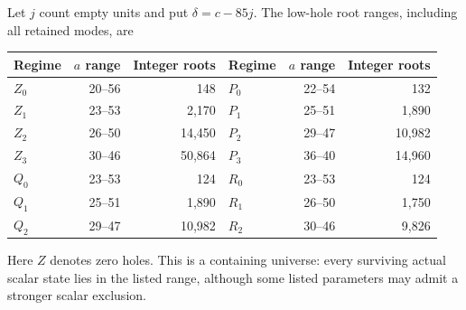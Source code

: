 \documentclass[11pt,a4paper]{article}
\begin{document}
Let $j$ count empty units and put $\delta=c-85j$.
The low-hole root ranges, including all retained modes, are
\begin{center}\small
\begin{tabular}{lrr@{\qquad}lrr}\toprule
Regime&$a$ range&Integer roots&Regime&$a$ range&Integer roots\\\midrule
$Z_0$&20--56&148&$P_0$&22--54&132\\
$Z_1$&23--53&2,170&$P_1$&25--51&1,890\\
$Z_2$&26--50&14,450&$P_2$&29--47&10,982\\
$Z_3$&30--46&50,864&$P_3$&36--40&14,960\\
$Q_0$&23--53&124&$R_0$&23--53&124\\
$Q_1$&25--51&1,890&$R_1$&26--50&1,750\\
$Q_2$&29--47&10,982&$R_2$&30--46&9,826\\\bottomrule
\end{tabular}
\end{center}
Here $Z$ denotes zero holes. This is a containing universe: every
surviving actual scalar state lies in the listed range, although some
listed parameters may admit a stronger scalar exclusion.
\end{document}
